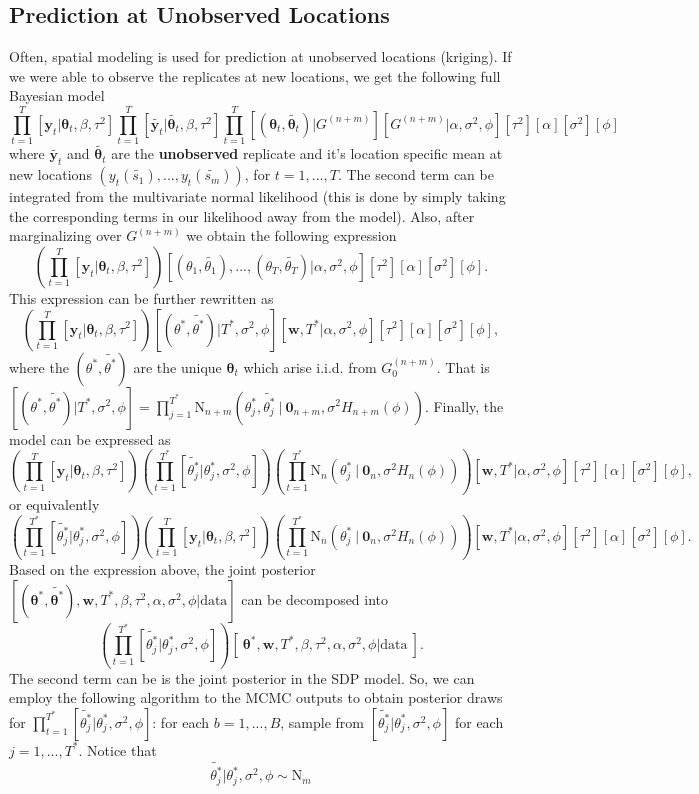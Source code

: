 \documentclass[11pt]{article}
\newcommand{\m}[1]{\mathbf{\bm{#1}}} %
\begin{document}
\subsection{Prediction at Unobserved Locations}
Often, spatial modeling is used for prediction at unobserved locations
(kriging). If we were able to observe the replicates at new locations, we
get the following full Bayesian model
\[
  \prod_{t=1}^{T} [\m y_t|\m\theta_t,\beta,\tau^2]
  \prod_{t=1}^{T} [\tilde{\m y_t}|\tilde{\m\theta_t},\beta,\tau^2]
  \prod_{t=1}^{T} [(\m\theta_t,\tilde{\m\theta_t})|G^{(n+m)}][G^{(n+m)}|\alpha,\sigma^2,\phi]
  [\tau^2][\alpha][\sigma^2][\phi]
\]
where $\tilde{\m y_t}$ and $\tilde{\m\theta_t}$ are the \textbf{unobserved}
replicate and it's location specific mean at new locations
$(y_t(\tilde{s_1}),...,y_t(\tilde{s_m}))$, for $t=1,...,T$. The second term can
be integrated from the multivariate normal likelihood (this is done by simply
taking the corresponding terms in our likelihood away from the model). Also, 
after marginalizing over $G^{(n+m)}$ we obtain the following expression
\[
  \left(\prod_{t=1}^{T} [\m y_t|\m\theta_t,\beta,\tau^2]\right)
  [(\theta_1,\tilde{\theta_1}),...,(\theta_T,\tilde{\theta_T})|\alpha,\sigma^2,\phi]
  [\tau^2][\alpha][\sigma^2][\phi].
\]
This expression can be further rewritten as 
\[
  \left(\prod_{t=1}^{T} [\m y_t|\m\theta_t,\beta,\tau^2]\right)
  [(\theta^*,\tilde{\theta^*})|T^*,\sigma^2,\phi][\m w, T^*|\alpha,\sigma^2,\phi]
  [\tau^2][\alpha][\sigma^2][\phi],
\]
where the $(\theta^*,\tilde{\theta^*})$ are the unique $\m\theta_t$ which arise
i.i.d. from $G_0^{(n+m)}$. That is
$[(\theta^*,\tilde{\theta^*})|T^*,\sigma^2,\phi]
=\prod_{j=1}^{T^*}\text{N}_{n+m}(\theta^*_j,\tilde{\theta^*_j}~|~\m
0_{n+m},\sigma^2 H_{n+m}(\phi))$. Finally, the model can be expressed as
\[
  \left(\prod_{t=1}^{T} [\m y_t|\m\theta_t,\beta,\tau^2]\right)
  \left(\prod_{t=1}^{T^*}[\tilde{\theta_j^*}| \theta_j^*,\sigma^2,\phi]\right)
  \left(\prod_{t=1}^{T^*}\text{N}_{n}(\theta^*_j~|~\m 0_{n},\sigma^2 H_n(\phi))\right)
  [\m w, T^*|\alpha,\sigma^2,\phi] [\tau^2][\alpha][\sigma^2][\phi],
\] or equivalently
\[
  \left(\prod_{t=1}^{T^*}[\tilde{\theta_j^*}| \theta_j^*,\sigma^2,\phi]\right)
  \left(\prod_{t=1}^{T} [\m y_t|\m\theta_t,\beta,\tau^2]\right)
  \left(\prod_{t=1}^{T^*}\text{N}_{n}(\theta^*_j~|~\m 0_{n},\sigma^2 H_n(\phi))\right)
  [\m w, T^*|\alpha,\sigma^2,\phi] [\tau^2][\alpha][\sigma^2][\phi].
\]
Based on the expression above, the joint posterior
$[(\m\theta^*,\tilde{\m\theta^*}),\m w, T^*,\beta,\tau^2,\alpha,\sigma^2,\phi|\text{data}]$
can be decomposed into 
\[
  \left(\prod_{t=1}^{T^*}[\tilde{\theta_j^*}| \theta_j^*,\sigma^2,\phi]\right)
  [~\m\theta^*,\m w, T^*,\beta,\tau^2,\alpha,\sigma^2,\phi|\text{data}~].
\]
The second term can be is the joint posterior in the SDP model. So, we can employ 
the following algorithm to the MCMC outputs to obtain posterior draws for 
$\prod_{t=1}^{T^*}[\tilde{\theta_j^*}| \theta_j^*,\sigma^2,\phi]$: 
for each $b = 1,...,B$, sample from $[\tilde{\theta_j^*}| \theta_j^*,\sigma^2,\phi]$
for each $j = 1,...,T^*$. Notice that 
\[
  \tilde{\theta_j^*}| \theta_j^*,\sigma^2,\phi \sim \text{N}_m
\]
\end{document}

